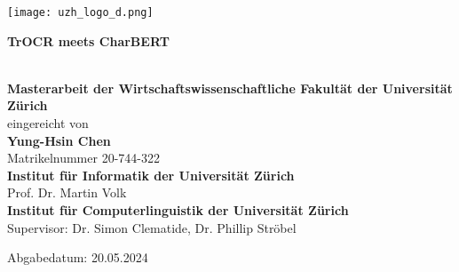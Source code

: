 \begin{titlepage}
\texttt{[image: uzh\_logo\_d.png]}\\ 

\begin{center}

\vspace{1.5cm}
\begin{Huge}\textbf{TrOCR meets CharBERT}\end{Huge}\\

\vspace{2cm}
\vfill {\Large \textbf{Masterarbeit der Wirtschaftswissenschaftliche Fakultät der Universität Zürich}} \\%
\Large eingereicht von\\	\Large\textbf{Yung-Hsin Chen} \\ 
Matrikelnummer 20-744-322 \\

\vspace{4cm}  
\vfill {\large \textbf{Institut für Informatik der Universität Zürich}\\Prof. Dr. Martin Volk\\
\large \textbf{Institut für Computerlinguistik der Universität Zürich}\\
Supervisor: Dr. Simon Clematide, Dr. Phillip Ströbel}

\vspace{1cm}

\vfill{\large Abgabedatum: 20.05.2024}
\vspace{3cm}
\end{center}

\end{titlepage}

\newpage
